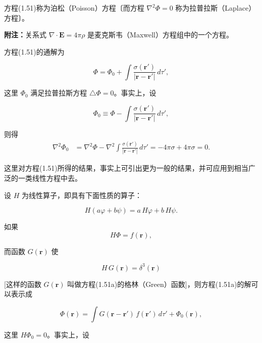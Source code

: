 \documentclass[11pt,a4paper,oneside]{ctexbook}
\newcommand{\ve}[1]{\bm{#1}}
\begin{document}
方程(1.51)称为泊松（Poisson）方程〔而方程 $\nabla^{2}\Phi = 0$ 称为拉普拉斯（Laplace）方程〕。

\textbf{附注：}关系式 $\nabla \cdot \ve{E} = 4\pi\rho$ 是麦克斯韦（Maxwell）方程组中的一个方程。

方程(1.51)的通解为

\begin{equation*}
\Phi = \Phi_0 + \int \frac{\sigma(\ve{r}')}{|\ve{r} - \ve{r}'|}\, d\tau',
\end{equation*}

这里 $\Phi_0$ 满足拉普拉斯方程 $\triangle\Phi = 0$。事实上，设

\begin{equation*}
\Phi_0 \equiv \Phi - \int \frac{\sigma(\ve{r}')}{|\ve{r} - \ve{r}'|}\, d\tau',
\end{equation*}

则得
\begin{equation*}
\begin{aligned}
\nabla^{2}\Phi_0 &= \nabla^{2}\Phi - \nabla^{2} \int \frac{\sigma(\ve{r}')}{|\ve{r} - \ve{r}'|}\, d\tau' = -4\pi\sigma + 4\pi\sigma = 0.
\end{aligned}
\end{equation*}

这里对方程(1.51)所得的结果，事实上可引出更为一般的结果，并可应用到相当广泛的一类线性方程中去。

设 $H$ 为线性算子，即具有下面性质的算子：

\begin{equation*}
H(a\varphi + b\psi) = a\, H\varphi + b\, H\psi.
\end{equation*}

如果
\begin{equation}
H\Phi = f(\ve{r}),
\tag{1.51a}
\end{equation}

而函数 $G(\ve{r})$ 使

\begin{equation*}
H\, G(\ve{r}) = \delta^{3}(\ve{r})
\end{equation*}

[这样的函数 $G(\ve{r})$ 叫做方程(1.51a)的格林（Green）函数]，则方程(1.51a)的解可以表示成

\begin{equation*}
\Phi(\ve{r}) = \int G(\ve{r} - \ve{r}')\, f(\ve{r}')\, d\tau' + \Phi_0(\ve{r}),
\end{equation*}

这里 $H\Phi_0 = 0$。事实上，设
\end{document}
